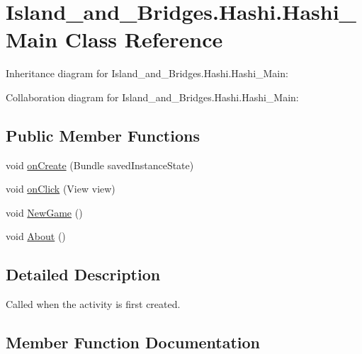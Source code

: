 \hypertarget{class_island__and___bridges_1_1_hashi_1_1_hashi___main}{}\section{Island\+\_\+and\+\_\+\+Bridges.\+Hashi.\+Hashi\+\_\+\+Main Class Reference}
\label{class_island__and___bridges_1_1_hashi_1_1_hashi___main}


Inheritance diagram for Island\+\_\+and\+\_\+\+Bridges.\+Hashi.\+Hashi\+\_\+\+Main\+:


Collaboration diagram for Island\+\_\+and\+\_\+\+Bridges.\+Hashi.\+Hashi\+\_\+\+Main\+:
\subsection*{Public Member Functions}
\begin{DoxyCompactItemize}
\item 
void \mbox{\hyperlink{class_island__and___bridges_1_1_hashi_1_1_hashi___main_a00db9debcf1138ea9080e3762a5e7ac1}{on\+Create}} (Bundle saved\+Instance\+State)
\item 
void \mbox{\hyperlink{class_island__and___bridges_1_1_hashi_1_1_hashi___main_a83eca6cab4321b6ab0aaa2eed90df0af}{on\+Click}} (View view)
\item 
void \mbox{\hyperlink{class_island__and___bridges_1_1_hashi_1_1_hashi___main_a5d0c1338ad67caa10dea9f59861f48e8}{New\+Game}} ()
\item 
void \mbox{\hyperlink{class_island__and___bridges_1_1_hashi_1_1_hashi___main_a4801a68471b323f3351d360ad3800b38}{About}} ()
\end{DoxyCompactItemize}


\subsection{Detailed Description}
Called when the activity is first created. 

\subsection{Member Function Documentation}
\mbox{\label{class_island__and___bridges_1_1_hashi_1_1_hashi___main_a4801a68471b323f3351d360ad3800b38}} 
